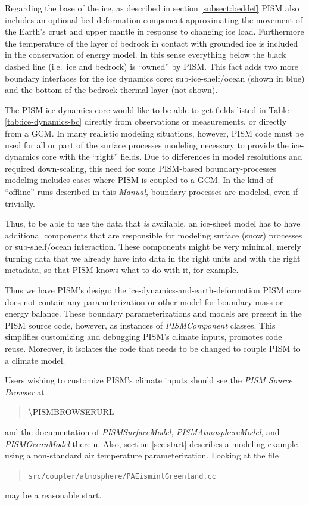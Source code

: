 \documentclass[titlepage,letterpaper,final]{scrartcl}
\begin{document}
Regarding the base of the ice, as described in section \ref{subsect:beddef} PISM also includes an optional bed deformation component approximating the movement of the Earth's crust and upper mantle in response to changing ice load.   Furthermore the temperature of the layer of bedrock in contact with grounded ice is included in the conservation of energy model.  In this sense everything below the black dashed line (i.e.~ice and bedrock) is ``owned'' by PISM.  This fact adds two more boundary interfaces for the ice dynamics core: sub-ice-shelf/ocean (shown in blue) and the bottom of the bedrock thermal layer (not shown).

The PISM ice dynamics core would like to be able to get fields listed in Table
\ref{tab:ice-dynamics-bc} directly from observations or measurements, or directly from a GCM.  In many realistic modeling situations, however, PISM code must be used for all or part of the surface processes modeling necessary to provide the ice-dynamics core with the ``right'' fields.  Due to differences in model resolutions and required down-scaling, this need for some PISM-based boundary-processes modeling includes cases where PISM is coupled to a GCM.  In the kind of ``offline'' runs described in this \emph{Manual}, boundary processes are modeled, even if trivially.

Thus, to be able to use the data that \emph{is} available, an ice-sheet model has to
have additional components that are responsible for modeling surface (snow)
processes or sub-shelf/ocean interaction.  These components might be very minimal, merely turning data that we already have into data in the right units and with the right metadata, so that PISM knows what to do with it, for example.

Thus we have PISM's design: the ice-dynamics-and-earth-deformation PISM
core does not contain any parameterization or other model for boundary mass or
energy balance.  These boundary parameterizations and models are present in the PISM source code, however, as instances of \emph{PISMComponent} classes.  This simplifies customizing and debugging PISM's climate
inputs, promotes code reuse.  Moreover, it isolates the code that needs to be changed to
couple PISM to a climate model.

Users wishing to customize PISM's climate inputs should see the \emph{PISM
  Source Browser} at
\begin{quote}
  \url{\PISMBROWSERURL}
\end{quote}
 and the documentation
of \mbox{\emph{PISMSurfaceModel}}, \mbox{\emph{PISMAtmosphereModel}}, and
\mbox{\emph{PISMOceanModel}} therein.  Also, section \ref{sec:start} describes a
modeling example using a non-standard air temperature parameterization. Looking
at the file
\begin{quote}
\texttt{src/coupler/atmosphere/PAEismintGreenland.cc}
\end{quote}
may be a reasonable start.
\end{document}
